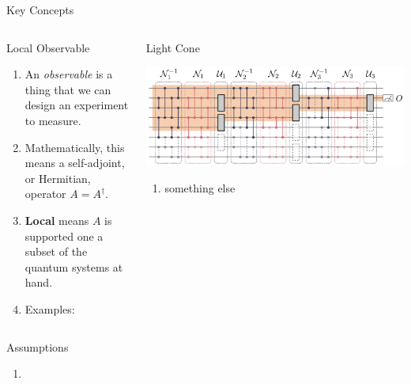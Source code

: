 \documentclass[11pt,aspectratio=1610,xcolor=dvipsnames]{beamer}
\begin{document}
\begin{frame}{Key Concepts}
	\begin{columns}
		\begin{column}[t]{0.5\textwidth}
			{\Large Local Observable}
			\begin{enumerate}
				\item An \emph{observable} is a thing that we can design an experiment to measure.
				\item Mathematically, this means a self-adjoint, or Hermitian, operator $A = A^\dag$.
				\item \textbf{Local} means $A$ is supported one a subset of the quantum systems at hand.
				\item Examples:
			\end{enumerate}
		\end{column}
		\begin{column}[t]{0.5\textwidth}
			{\Large Light Cone}
			\begin{center}
				\includegraphics[width=\textwidth]{lightcone}
			\end{center}
			\begin{enumerate}
				\item something else
			\end{enumerate}
		\end{column}
	\end{columns}
\end{frame}

\begin{frame}{Assumptions}
	\begin{enumerate}
		\item
	\end{enumerate}
\end{frame}
\end{document}
